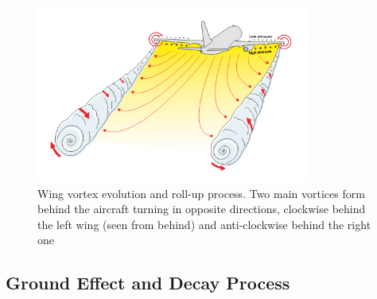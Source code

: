 \begin{figure}[h]
    \centering
    \includegraphics[width=0.8\textwidth]{graphics/WakeVortexPlane.png}
    \caption[Wake vortex roll-up process]{Wing vortex evolution and roll-up process. Two main vortices form behind the aircraft turning in opposite directions, clockwise behind the left wing (seen from behind) and anti-clockwise behind the right one~\cite[p. 043]{magazine_aibus_safety}} \label{fig:vortex_develop}
\end{figure}

\subsection{Ground Effect and Decay Process}

